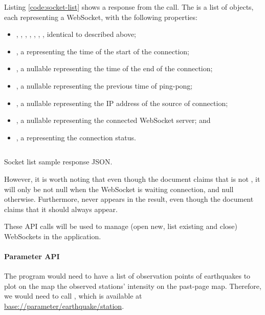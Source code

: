 Listing \ref{code:socket-list} shows a response from the call. The  is a list of objects, each representing a WebSocket, with the following properties:
\begin{itemize}
    \item {}, , , , , , , identical to described above;
    \item {}, a  representing the time of the start of the connection;
    \item {}, a nullable  representing the time of the end of the connection;
    \item {}, a nullable  representing the previous time of ping-pong;
    \item {}, a nullable  representing the IP address of the source of connection;
    \item {}, a nullable  representing the connected WebSocket server; and
    \item {}, a  representing the connection status.
\end{itemize}

\begin{listing}[htp]
    \inputminted{json}{code/SocketList.json}
    \caption{Socket list sample response JSON.}
    \label{code:socket-list}
\end{listing}

However, it is worth noting that even though the document claims that  is not , it will only be not null when the WebSocket is waiting connection, and null otherwise. Furthermore,  never appears in the result, even though the document claims that it should always appear.

These API calls will be used to manage (open new, list existing and close) WebSockets in the application.

\paragraph{Parameter API}

The program would need to have a list of observation points of earthquakes to plot on the map the observed stations' intensity on the past-page map. Therefore, we would need to call , which is available at \url{base://parameter/earthquake/station}.

